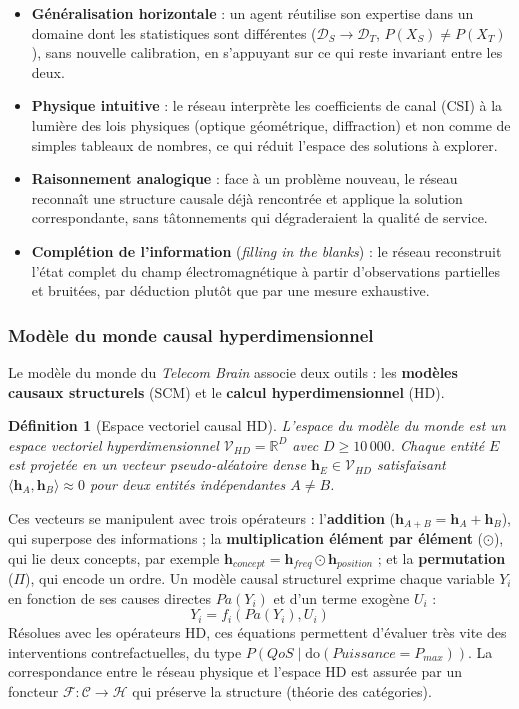 \documentclass[12pt,a4paper,titlepage]{article}
\newtheorem{definition}{Définition}[section]
\begin{document}
\begin{itemize}[leftmargin=1.5em]
    \item \textbf{Généralisation horizontale} : un agent réutilise son expertise dans un domaine dont les statistiques sont différentes ($\mathcal{D}_S \to \mathcal{D}_T$, $P(X_S) \neq P(X_T)$), sans nouvelle calibration, en s'appuyant sur ce qui reste invariant entre les deux.
    \item \textbf{Physique intuitive} : le réseau interprète les coefficients de canal (CSI) à la lumière des lois physiques (optique géométrique, diffraction) et non comme de simples tableaux de nombres, ce qui réduit l'espace des solutions à explorer.
    \item \textbf{Raisonnement analogique} : face à un problème nouveau, le réseau reconnaît une structure causale déjà rencontrée et applique la solution correspondante, sans tâtonnements qui dégraderaient la qualité de service.
    \item \textbf{Complétion de l'information} (\textit{filling in the blanks}) : le réseau reconstruit l'état complet du champ électromagnétique à partir d'observations partielles et bruitées, par déduction plutôt que par une mesure exhaustive.
\end{itemize}

\subsubsection{Modèle du monde causal hyperdimensionnel}

Le modèle du monde du \textit{Telecom Brain} associe deux outils : les \textbf{modèles causaux structurels} (SCM) et le \textbf{calcul hyperdimensionnel} (HD).

\begin{definition}[Espace vectoriel causal HD]
L'espace du modèle du monde est un espace vectoriel hyperdimensionnel $\mathcal{V}_{HD} = \mathbb{R}^D$ avec $D \geq 10\,000$. Chaque entité $E$ est projetée en un vecteur pseudo-aléatoire dense $\mathbf{h}_E \in \mathcal{V}_{HD}$ satisfaisant $\langle \mathbf{h}_A, \mathbf{h}_B \rangle \approx 0$ pour deux entités indépendantes $A \neq B$.
\end{definition}

Ces vecteurs se manipulent avec trois opérateurs : l'\textbf{addition} ($\mathbf{h}_{A+B} = \mathbf{h}_A + \mathbf{h}_B$), qui superpose des informations ; la \textbf{multiplication élément par élément} ($\odot$), qui lie deux concepts, par exemple $\mathbf{h}_{concept} = \mathbf{h}_{freq} \odot \mathbf{h}_{position}$ ; et la \textbf{permutation} ($\Pi$), qui encode un ordre. Un modèle causal structurel exprime chaque variable $Y_i$ en fonction de ses causes directes $Pa(Y_i)$ et d'un terme exogène $U_i$ :
\begin{equation}
    Y_i = f_i(Pa(Y_i), U_i)
    \label{eq:scm}
\end{equation}
Résolues avec les opérateurs HD, ces équations permettent d'évaluer très vite des interventions contrefactuelles, du type $P(QoS \mid \mathrm{do}(Puissance = P_{max}))$. La correspondance entre le réseau physique et l'espace HD est assurée par un foncteur $\mathcal{F} : \mathcal{C} \to \mathcal{H}$ qui préserve la structure (théorie des catégories).
\end{document}
